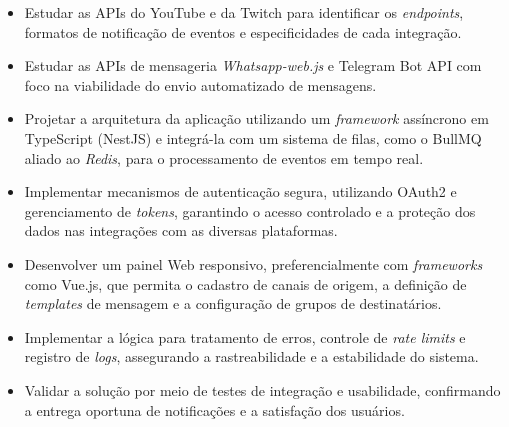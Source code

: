 \begin{itemize}
    \item Estudar as APIs do YouTube e da Twitch para identificar os \textit{endpoints}, formatos de notificação de eventos e especificidades de cada integração.
    \par\vspace{0.25\baselineskip}
    
    \item Estudar as APIs de mensageria \textit{Whatsapp-web.js} e Telegram Bot API com foco na viabilidade do envio automatizado de mensagens.
    \par\vspace{0.25\baselineskip}
    
    \item Projetar a arquitetura da aplicação utilizando um \textit{framework} assíncrono em TypeScript (NestJS) e integrá-la com um sistema de filas, como o BullMQ aliado ao \textit{Redis}, para o processamento de eventos em tempo real.
    \par\vspace{0.25\baselineskip}
    
    \item Implementar mecanismos de autenticação segura, utilizando OAuth2 e gerenciamento de \textit{tokens}, garantindo o acesso controlado e a proteção dos dados nas integrações com as diversas plataformas.
    \par\vspace{0.25\baselineskip}
    
    \item Desenvolver um painel Web responsivo, preferencialmente com \textit{frameworks} como Vue.js, que permita o cadastro de canais de origem, a definição de \textit{templates} de mensagem e a configuração de grupos de destinatários.
    \par\vspace{0.25\baselineskip}
    
    \item Implementar a lógica para tratamento de erros, controle de \textit{rate limits} e registro de \textit{logs}, assegurando a rastreabilidade e a estabilidade do sistema.
    \par\vspace{0.25\baselineskip}
    
    \item Validar a solução por meio de testes de integração e usabilidade, confirmando a entrega oportuna de notificações e a satisfação dos usuários.
\end{itemize}


